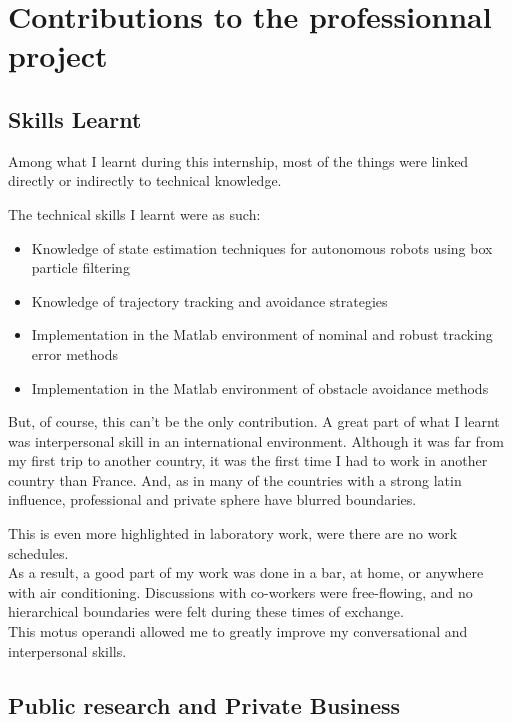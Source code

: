 \chapter{Contributions to the professionnal project}

\label{apport}


\section{Skills Learnt}
Among what I learnt during this internship, most of the things were linked directly or indirectly to technical knowledge.

The technical skills I learnt were as such:

\begin{itemize}
  \item Knowledge of state estimation techniques for autonomous robots using box particle filtering
  \item Knowledge of trajectory tracking and avoidance strategies
  \item Implementation in the Matlab environment of nominal and robust tracking error methods
  \item Implementation in the Matlab environment of obstacle avoidance methods
\end{itemize}

But, of course, this can't be the only contribution. A great part of what I learnt was interpersonal skill in an international environment.
Although it was far from my first trip to another country, it was the first time I had to work in another country than France.
And, as in many of the countries with a strong latin influence, professional and private sphere have blurred boundaries.

This is even more highlighted in laboratory work, were there are no work schedules.\\

As a result, a good part of my work was done in a bar, at home, or anywhere with air conditioning.
Discussions with co-workers were free-flowing, and no hierarchical boundaries were felt during these times of exchange.\\

This motus operandi allowed me to greatly improve my conversational and interpersonal skills.

\section{Public research and Private Business}

